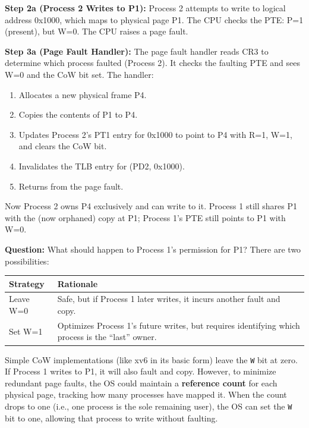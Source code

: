 \documentclass[11pt]{article}
\begin{document}
\textbf{Step 2a (Process 2 Writes to P1):} Process 2 attempts to write to logical address 0x1000, which maps to physical page P1. The CPU checks the PTE: P=1 (present), but W=0. The CPU raises a page fault.

\textbf{Step 3a (Page Fault Handler):} The page fault handler reads CR3 to determine which process faulted (Process 2). It checks the faulting PTE and sees W=0 and the CoW bit set. The handler:
\begin{enumerate}
    \item Allocates a new physical frame P4.
    \item Copies the contents of P1 to P4.
    \item Updates Process 2's PT1 entry for 0x1000 to point to P4 with R=1, W=1, and clears the CoW bit.
    \item Invalidates the TLB entry for (PD2, 0x1000).
    \item Returns from the page fault.
\end{enumerate}

Now Process 2 owns P4 exclusively and can write to it. Process 1 still shares P1 with the (now orphaned) copy at P1; Process 1's PTE still points to P1 with W=0.

\textbf{Question:} What should happen to Process 1's permission for P1? There are two possibilities:

\begin{center}
\begin{tabular}{lp{2.5in}}
\toprule
\textbf{Strategy} & \textbf{Rationale} \\
\midrule
Leave W=0 & Safe, but if Process 1 later writes, it incurs another fault and copy. \\
Set W=1 & Optimizes Process 1's future writes, but requires identifying which process is the ``last'' owner. \\
\bottomrule
\end{tabular}
\end{center}

Simple CoW implementations (like xv6 in its basic form) leave the \texttt{W} bit at zero. If Process 1 writes to P1, it will also fault and copy. However, to minimize redundant page faults, the OS could maintain a \textbf{reference count} for each physical page, tracking how many processes have mapped it. When the count drops to one (i.e., one process is the sole remaining user), the OS can set the \texttt{W} bit to one, allowing that process to write without faulting.
\end{document}
